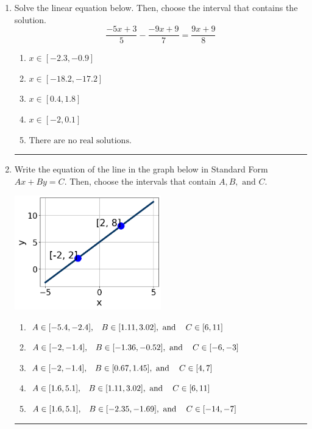 \documentclass[14pt]{extbook}
\newcommand{\litem}[1]{\item#1\hspace*{-1cm}\rule{\textwidth}{0.4pt}}
\begin{document}
\begin{enumerate}
{\begin{enumerate}[label=\Alph*.]
\end{enumerate} }
\litem{
Solve the linear equation below. Then, choose the interval that contains the solution.\[ \frac{-5x + 3}{5} - \frac{-9x + 9}{7} = \frac{9x + 9}{8} \]\begin{enumerate}[label=\Alph*.]
\item \( x \in [-2.3, -0.9] \)
\item \( x \in [-18.2, -17.2] \)
\item \( x \in [0.4, 1.8] \)
\item \( x \in [-2, 0.1] \)
\item \( \text{There are no real solutions.} \)

\end{enumerate} }
\litem{
Write the equation of the line in the graph below in Standard Form $Ax+By=C$. Then, choose the intervals that contain $A, B, \text{ and } C$.
\begin{center}
    \includegraphics[width=0.5\textwidth]{../Figures/linearGraphToStandardCopyC.png}
\end{center}
\begin{enumerate}[label=\Alph*.]
\item \( A \in [-5.4, -2.4], \hspace{3mm} B \in [1.11, 3.02], \text{ and } \hspace{3mm} C \in [6, 11] \)
\item \( A \in [-2, -1.4], \hspace{3mm} B \in [-1.36, -0.52], \text{ and } \hspace{3mm} C \in [-6, -3] \)
\item \( A \in [-2, -1.4], \hspace{3mm} B \in [0.67, 1.45], \text{ and } \hspace{3mm} C \in [4, 7] \)
\item \( A \in [1.6, 5.1], \hspace{3mm} B \in [1.11, 3.02], \text{ and } \hspace{3mm} C \in [6, 11] \)
\item \( A \in [1.6, 5.1], \hspace{3mm} B \in [-2.35, -1.69], \text{ and } \hspace{3mm} C \in [-14, -7] \)


\end{enumerate}}
\end{enumerate}
\end{document}
